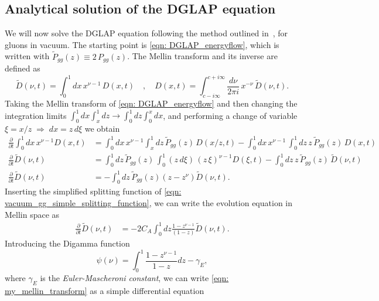 \documentclass[main.tex]{subfiles}
\begin{document}
\subsection{Analytical solution of the DGLAP equation}\label{sec: solution_DGLAP}
We will now solve the DGLAP equation following the method outlined in~\cite{Energy_flow_medium_cascade_2016}, for gluons in vacuum. The starting point is \autoref{eqn: DGLAP_energyflow}, which is written with \(\tilde P_{gg}(z) \equiv 2\, P_{gg}(z)\). The Mellin transform and its inverse are defined as
\begin{equation}\label{eqn: mellin_transforms}
    \tilde{D}(\nu, t) = \int_0^1 dx\, x^{\nu-1} \, D(x,t) \quad, \quad D(x,t) = \int_{c-i\infty}^{c+i\infty} \frac{d\nu}{2\pi i}\, x^{-\nu} \, \tilde{D}(\nu, t).
\end{equation}
Taking the Mellin transform of \autoref{eqn: DGLAP_energyflow} and then changing the integration limits \(\int_0^1 dx \int_x^1 dz \rightarrow \int_0^1 dz \int_0^x dx\), and performing a change of variable \(\xi = x/z \; \Rightarrow \; dx=z\, d\xi\) we obtain
\begin{align}
    \frac{\partial}{\partial t} \int_0^1 dx\,x^{\nu-1} D(x,t) &= \int_0^1 dx\,x^{\nu-1} \int_x^1 dz\, \tilde{P}_{gg}(z)\, D(x/z,t) - \int_0^1 dx\,x^{\nu-1}\, \int_0^1 dz\, z\,\tilde{P}_{gg}(z)\, D(x,t) 
    \nonumber \\
    \frac{\partial}{\partial t} \tilde D(\nu,t) &= \int_0^1 dz\, \tilde{P}_{gg}(z)\, \int_0^1 (z\, d\xi)\, (z\, \xi)^{\nu-1} D(\xi,t) - \int_0^1 dz\, z\, \tilde{P}_{gg}(z)\, \tilde D(\nu,t) \nonumber \\
    \frac{\partial}{\partial t} \tilde D(\nu,t) &= -\int_0^1 dz\,\tilde{P}_{gg}(z) \left(z-z^\nu \right) \tilde D(\nu,t).
\end{align}
Inserting the simplified splitting function of \autoref{eqn: vacuum_gg_simple_splitting_function}, we can write the evolution equation in Mellin space as
\begin{align}
    \frac{\partial}{\partial t} \tilde D(\nu,t) &= -2C_A \int_0^1 dz \frac{1-z^{\nu-1}}{(1-z)} \tilde D(\nu,t). \label{eqn: my_mellin_transform}
\end{align}
Introducing the Digamma function
\begin{equation}\label{eqn: digamma_function}
    \psi(\nu) = \int_0^1 \frac{1-z^{\nu-1}}{1-z}dz - \gamma_E,
\end{equation}
where \(\gamma_E\) is the \emph{Euler-Mascheroni constant}, we can write \autoref{eqn: my_mellin_transform} as a simple differential equation
\end{document}
